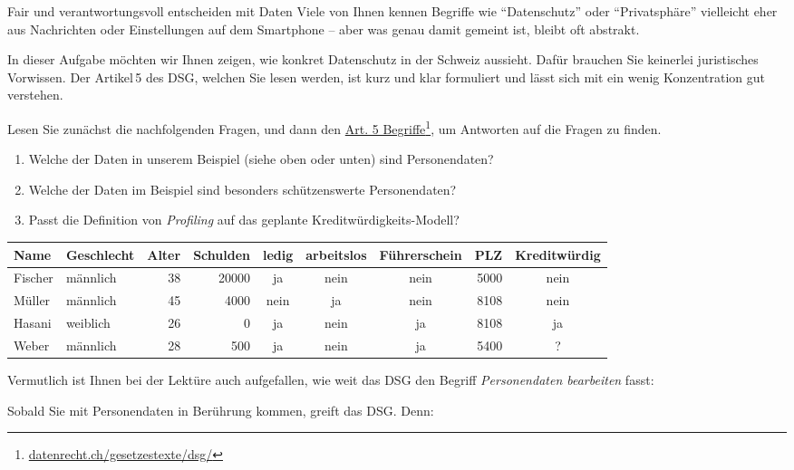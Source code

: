 \begin{lpu}{Fair und verantwortungsvoll entscheiden mit Daten}
Viele von Ihnen kennen Begriffe wie ``Datenschutz'' oder ``Privatsphäre'' vielleicht eher aus Nachrichten oder Einstellungen auf dem Smartphone – aber was genau damit gemeint ist, bleibt oft abstrakt.

In dieser Aufgabe möchten wir Ihnen zeigen, wie konkret Datenschutz in der Schweiz aussieht. Dafür brauchen Sie keinerlei juristisches Vorwissen. Der Artikel 5 des DSG, welchen Sie lesen werden, ist kurz und klar formuliert und lässt sich mit ein wenig Konzentration gut verstehen.

\begin{aufgabe}{2}
Lesen Sie zunächst die nachfolgenden Fragen, und dann den \href{https://datenrecht.ch/gesetzestexte/dsg/#id686591b1ad647}{Art. 5 Begriffe}\footnote{\href{https://datenrecht.ch/gesetzestexte/dsg/#id686591b1ad647}{\url{datenrecht.ch/gesetzestexte/dsg/}}}, um Antworten auf die Fragen zu finden. 

\begin{enumerate}
    \item Welche der Daten in unserem Beispiel (siehe oben oder unten) sind Personendaten?
    \item Welche der Daten im Beispiel sind besonders schützenswerte Personendaten?
    \item Passt die Definition von \textit{Profiling} auf das geplante Kreditwürdigkeits-Modell?
\end{enumerate}

\end{aufgabe}

\begin{table}[h]
\begin{tabularx}{0.6\textwidth}{|l|l|r|r|c|c|c|r|c|}
\hline
\textbf{Name} & \textbf{Geschlecht} & \textbf{Alter} & \textbf{Schulden} & \textbf{ledig} & \textbf{arbeitslos} & \textbf{Führerschein} & \textbf{PLZ} & \textbf{Kreditwürdig} \\
\hline
Fischer & männlich & 38 & 20000 & ja & nein & nein & 5000 & nein \\
Müller  & männlich & 45 & 4000  & nein & ja & nein & 8108 & nein \\
Hasani  & weiblich & 26 & 0     & ja & nein & ja & 8108 & ja \\
Weber   & männlich & 28 & 500   & ja & nein & ja & 5400 & \cellcolor{orange}? \\
\hline
\end{tabularx}
\end{table}

Vermutlich ist Ihnen bei der Lektüre auch aufgefallen, wie weit das DSG den Begriff \textit{Personendaten bearbeiten} fasst:
\begin{theorie}
    Sobald Sie mit Personendaten in Berührung kommen, greift das DSG. Denn:


\end{theorie}
\end{lpu}
